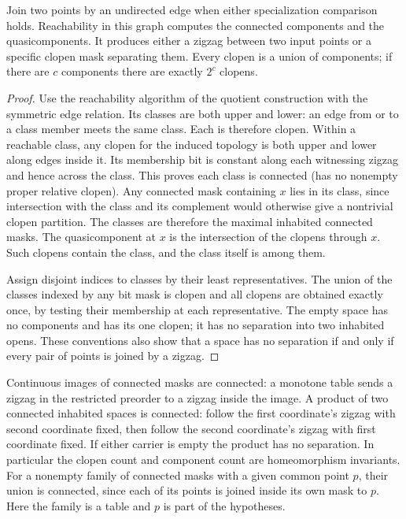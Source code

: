\begin{theorem}\label{idx-finite348}
Join two points by an undirected edge when either specialization comparison
holds. Reachability in this graph computes the connected components and
the quasicomponents. It produces either a zigzag between two input points
or a specific clopen mask separating them. Every clopen is a union of
components; if there are $c$ components there are exactly $2^c$ clopens.
\end{theorem}
\begin{proof}
Use the reachability algorithm of the quotient construction with the
symmetric edge relation. Its classes are both upper and lower: an
edge from or to a class member meets the same class. Each is therefore
clopen. Within a reachable class, any clopen for the induced topology is
both upper and lower along edges inside it. Its membership bit is constant
along each witnessing zigzag and hence across the class. This proves each
class is connected (has no nonempty proper relative clopen). Any connected
mask containing $x$ lies in its class, since intersection with the class
and its complement would otherwise give a nontrivial clopen partition.
The classes are therefore the maximal inhabited connected masks. The
quasicomponent at $x$ is the intersection of the clopens through $x$.
Such clopens contain the class, and the class itself is among them.

Assign disjoint indices to classes by their least representatives. The union
of the classes indexed by any bit mask is clopen and all clopens are
obtained exactly once, by testing their membership at each representative.
The empty space has no components and has its one clopen; it has no
separation into two inhabited opens. These conventions also show that a
space has no separation if and only if every pair of points is joined by
a zigzag.
\end{proof}

Continuous images of connected masks are connected: a monotone table sends
a zigzag in the restricted preorder to a zigzag inside the image. A product
of two connected inhabited spaces is connected: follow the first coordinate's
zigzag with second coordinate fixed, then follow the second coordinate's
zigzag with first coordinate fixed. If either carrier is empty the product
has no separation. In particular the clopen count and component count are
homeomorphism invariants. For a nonempty family of connected masks with a
given common point $p$, their union is connected, since each of its points
is joined inside its own mask to $p$. Here the family is a table and $p$
is part of the hypotheses.

